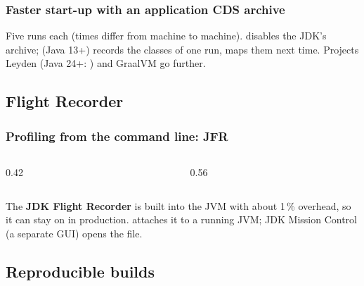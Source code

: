 \documentclass[aspectratio=169,10pt,compress]{beamer}
\begin{document}
\begin{frame}[t,fragile] \frametitle{Faster start-up with an application CDS archive}

  \vspace{0.1em}
  \small
  Five runs each (times differ from machine to machine).  disables the JDK's archive;
   (Java 13+) records the classes of one run,  maps them next time.
  Projects Leyden (Java 24+: ) and GraalVM  go further.
\end{frame}

\subsection[JFR]{Flight Recorder}




\begin{frame}[t,fragile] \frametitle{Profiling from the command line: JFR}
  \begin{columns}[T]
    \begin{column}{0.42\textwidth}
    \end{column}
    \begin{column}{0.56\textwidth}
    \end{column}
  \end{columns}

  \vspace{0.1em}
  \small The \textbf{JDK Flight Recorder} is built into the JVM with about 1\,\% overhead, so it can stay on in production.
   attaches it to a running JVM; JDK Mission Control (a separate GUI) opens the  file.
\end{frame}


\subsection[Reproducible]{Reproducible builds}
\end{document}
